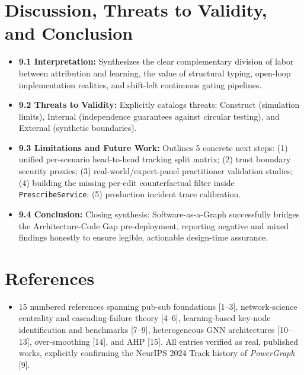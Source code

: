 \documentclass[review]{elsarticle}
\begin{document}
\section{Discussion, Threats to Validity, and Conclusion}

\begin{itemize}[leftmargin=*]
  \item \textbf{9.1 Interpretation:} Synthesizes the clear complementary division of labor between attribution and learning, the value of structural typing, open-loop implementation realities, and shift-left continuous gating pipelines.
  \item \textbf{9.2 Threats to Validity:} Explicitly catalogs threats: Construct (simulation limits), Internal (independence guarantees against circular testing), and External (synthetic boundaries).
  \item \textbf{9.3 Limitations and Future Work:} Outlines 5 concrete next steps: (1) unified per-scenario head-to-head tracking split matrix; (2) trust boundary security proxies; (3) real-world/expert-panel practitioner validation studies; (4) building the missing per-edit counterfactual filter inside \texttt{PrescribeService}; (5) production incident trace calibration.
  \item \textbf{9.4 Conclusion:} Closing synthesis: Software-as-a-Graph successfully bridges the Architecture-Code Gap pre-deployment, reporting negative and mixed findings honestly to ensure legible, actionable design-time assurance.
\end{itemize}

\section*{References}

\begin{itemize}[leftmargin=*]
  \item 15 numbered references spanning pub-sub foundations [1--3], network-science centrality and
    cascading-failure theory [4--6], learning-based key-node identification and benchmarks [7--9],
    heterogeneous GNN architectures [10--13], over-smoothing [14], and AHP [15]. All entries
    verified as real, published works, explicitly confirming the NeurIPS 2024 Track history of
    \emph{PowerGraph} [9].
\end{itemize}
\end{document}
